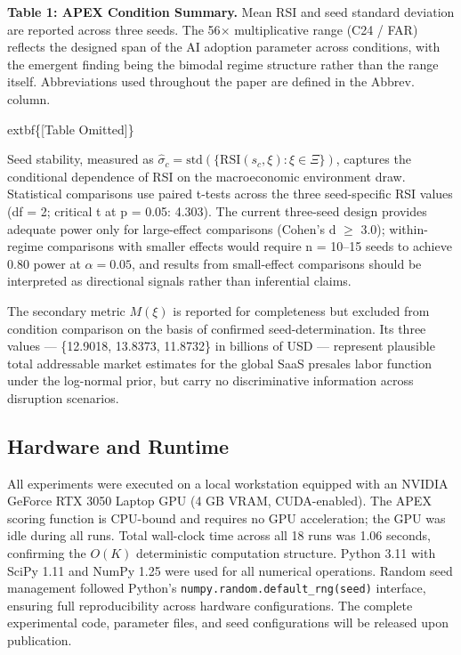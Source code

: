 \documentclass[10pt, conference]{IEEEtran}
\begin{document}
\textbf{Table 1: APEX Condition Summary.} Mean RSI and seed standard deviation are reported across three seeds. The 56$\times$ multiplicative range (C24 / FAR) reflects the designed span of the AI adoption parameter across conditions, with the emergent finding being the bimodal regime structure rather than the range itself. Abbreviations used throughout the paper are defined in the Abbrev. column.

	extbf\{[Table Omitted]\}

Seed stability, measured as $\hat{\sigma}_c = \text{std}(\{\text{RSI}(s_c, \xi) : \xi \in \Xi\})$, captures the conditional dependence of RSI on the macroeconomic environment draw. Statistical comparisons use paired t-tests across the three seed-specific RSI values (df = 2; critical t at p = 0.05: 4.303). The current three-seed design provides adequate power only for large-effect comparisons (Cohen's d $\geq$ 3.0); within-regime comparisons with smaller effects would require n = 10--15 seeds to achieve 0.80 power at $\alpha = 0.05$, and results from small-effect comparisons should be interpreted as directional signals rather than inferential claims.

The secondary metric $M(\xi)$ is reported for completeness but excluded from condition comparison on the basis of confirmed seed-determination. Its three values --- \{12.9018, 13.8373, 11.8732\} in billions of USD --- represent plausible total addressable market estimates for the global SaaS presales labor function under the log-normal prior, but carry no discriminative information across disruption scenarios.

\subsection{Hardware and Runtime}

\label{sec:hardware_and_runtime}

All experiments were executed on a local workstation equipped with an NVIDIA GeForce RTX 3050 Laptop GPU (4 GB VRAM, CUDA-enabled). The APEX scoring function is CPU-bound and requires no GPU acceleration; the GPU was idle during all runs. Total wall-clock time across all 18 runs was 1.06 seconds, confirming the $O(K)$ deterministic computation structure. Python 3.11 with SciPy 1.11 \cite{virtanen2020scipy} and NumPy 1.25 were used for all numerical operations. Random seed management followed Python's \texttt{numpy.random.default\_rng(seed)} interface, ensuring full reproducibility across hardware configurations. The complete experimental code, parameter files, and seed configurations will be released upon publication.
\end{document}
